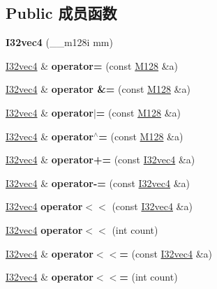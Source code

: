 \subsection*{Public 成员函数}
\begin{DoxyCompactItemize}
\item 
\mbox{\label{class_i32vec4_ab7c28d229ffa5537760b637d7188d876}} 
{\bfseries I32vec4} (\+\_\+\+\_\+m128i mm)
\item 
\mbox{\label{class_i32vec4_a85652531f8d14480f4360f9d3a76984b}} 
\hyperlink{class_i32vec4}{I32vec4} \& {\bfseries operator=} (const \hyperlink{class_m128}{M128} \&a)
\item 
\mbox{\label{class_i32vec4_ac6eaa25042f6baacf2e2d69a6095664f}} 
\hyperlink{class_i32vec4}{I32vec4} \& {\bfseries operator \&=} (const \hyperlink{class_m128}{M128} \&a)
\item 
\mbox{\label{class_i32vec4_ab1ea22543608506eb597908ac046b3ed}} 
\hyperlink{class_i32vec4}{I32vec4} \& {\bfseries operator$\vert$=} (const \hyperlink{class_m128}{M128} \&a)
\item 
\mbox{\label{class_i32vec4_ac10edc10e8c9b6c263af5a6f700f5891}} 
\hyperlink{class_i32vec4}{I32vec4} \& {\bfseries operator$^\wedge$=} (const \hyperlink{class_m128}{M128} \&a)
\item 
\mbox{\label{class_i32vec4_afe3ee9ddc3724f5737b282da71187a59}} 
\hyperlink{class_i32vec4}{I32vec4} \& {\bfseries operator+=} (const \hyperlink{class_i32vec4}{I32vec4} \&a)
\item 
\mbox{\label{class_i32vec4_a695920fdcc5c4cc7bdede418eae6cfec}} 
\hyperlink{class_i32vec4}{I32vec4} \& {\bfseries operator-\/=} (const \hyperlink{class_i32vec4}{I32vec4} \&a)
\item 
\mbox{\label{class_i32vec4_ae431223559606673bae8269a2160ebba}} 
\hyperlink{class_i32vec4}{I32vec4} {\bfseries operator$<$$<$} (const \hyperlink{class_i32vec4}{I32vec4} \&a)
\item 
\mbox{\label{class_i32vec4_ab76f0953150dfc952e19b41193c60d83}} 
\hyperlink{class_i32vec4}{I32vec4} {\bfseries operator$<$$<$} (int count)
\item 
\mbox{\label{class_i32vec4_a2fb48bf061417a872f4941912c4c0688}} 
\hyperlink{class_i32vec4}{I32vec4} \& {\bfseries operator$<$$<$=} (const \hyperlink{class_i32vec4}{I32vec4} \&a)
\item 
\mbox{\label{class_i32vec4_a653e766e1fd42244ccbd43495d6d4d3a}} 
\hyperlink{class_i32vec4}{I32vec4} \& {\bfseries operator$<$$<$=} (int count)
\end{DoxyCompactItemize}

